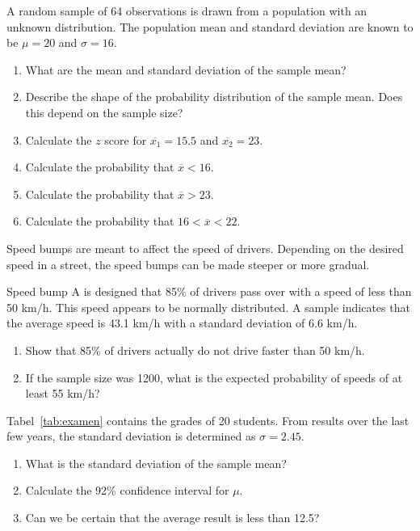 \begin{exercise}
  A random sample of 64 observations is drawn from a population with an unknown distribution. The population mean and standard deviation are known to be $\mu = 20$ and $\sigma=16$.
  
  \begin{enumerate}[label=\alph*.]
    \item What are the mean and standard deviation of the sample mean?
    \item Describe the shape of the probability distribution of the sample mean. Does this depend on the sample size?
    \item Calculate the $z$ score for $\overline{x_{1}} = 15.5$ and $\overline{x_{2}} = 23$.
    \item Calculate the probability that $\overline{x} <16$.
    \item Calculate the probability that $\overline{x} > 23$.
    \item Calculate the probability that $16< \overline{x}< 22$.
  \end{enumerate}
\end{exercise}

\begin{exercise}
  Speed bumps are meant to affect the speed of drivers. Depending on the desired speed in a street, the speed bumps can be made steeper or more gradual.
  
  Speed bump A is designed that 85\% of drivers pass over with a speed of less than 50 km/h. This speed appears to be normally distributed. A sample indicates that the average speed is 43.1 km/h with a standard deviation of 6.6 km/h.
  
  \begin{enumerate}[label=\alph*.]
    \item Show that 85\% of drivers actually do not drive faster than 50 km/h.
    \item If the sample size was 1200, what is the expected probability of speeds of at least 55 km/h?
  \end{enumerate}
\end{exercise}

\begin{exercise}
  Tabel~\ref{tab:examen} contains the grades of 20 students. From results over the last few years, the standard deviation is determined as $\sigma = 2.45$.
  
  \begin{enumerate}[label=\alph*.]
    \item What is the standard deviation of the sample mean?
    \item Calculate the 92\% confidence interval for $\mu$.
    \item Can we be certain that the average result is less than 12.5?
  \end{enumerate}
\end{exercise}

